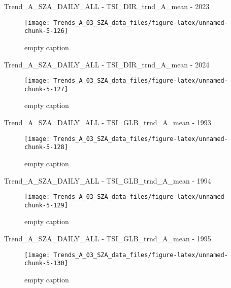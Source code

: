 \documentclass[
  10pt,
  a4paper,oneside]{article}
\begin{document}
Trend\_A\_SZA\_DAILY\_ALL - TSI\_DIR\_trnd\_A\_mean - 2023

\begin{figure}[!ht]

{\centering \texttt{[image: Trends\_A\_03\_SZA\_data\_files/figure-latex/unnamed-chunk-5-126]} 

}

\caption{ empty caption }\label{fig:unnamed-chunk-5-126}
\end{figure}

Trend\_A\_SZA\_DAILY\_ALL - TSI\_DIR\_trnd\_A\_mean - 2024

\begin{figure}[!ht]

{\centering \texttt{[image: Trends\_A\_03\_SZA\_data\_files/figure-latex/unnamed-chunk-5-127]} 

}

\caption{ empty caption }\label{fig:unnamed-chunk-5-127}
\end{figure}

Trend\_A\_SZA\_DAILY\_ALL - TSI\_GLB\_trnd\_A\_mean - 1993

\begin{figure}[!ht]

{\centering \texttt{[image: Trends\_A\_03\_SZA\_data\_files/figure-latex/unnamed-chunk-5-128]} 

}

\caption{ empty caption }\label{fig:unnamed-chunk-5-128}
\end{figure}

Trend\_A\_SZA\_DAILY\_ALL - TSI\_GLB\_trnd\_A\_mean - 1994

\begin{figure}[!ht]

{\centering \texttt{[image: Trends\_A\_03\_SZA\_data\_files/figure-latex/unnamed-chunk-5-129]} 

}

\caption{ empty caption }\label{fig:unnamed-chunk-5-129}
\end{figure}

Trend\_A\_SZA\_DAILY\_ALL - TSI\_GLB\_trnd\_A\_mean - 1995

\begin{figure}[!ht]

{\centering \texttt{[image: Trends\_A\_03\_SZA\_data\_files/figure-latex/unnamed-chunk-5-130]} 

}

\caption{ empty caption }\label{fig:unnamed-chunk-5-130}
\end{figure}
\end{document}
